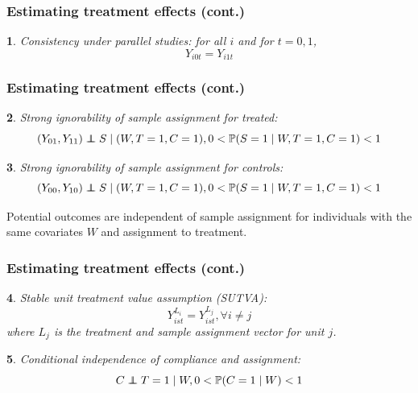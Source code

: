 \documentclass{beamer}
\makeatletter
\newtheorem*{assumption*}{\assumptionnumber}
\providecommand{\assumptionnumber}{}
\newenvironment{assumption}[2]
 {%
  \renewcommand{\assumptionnumber}{Assumption #1}%
  \begin{assumption*}%
  \protected@edef\@currentlabel{#1}%
 }
 {%
  \end{assumption*}
 }
\newcommand{\pr}{\mathbb{P}} %
\newcommand\independent{\protect\mathpalette{\protect\independenT}{\perp}}
\def\independenT#1#2{\mathrel{\rlap{$#1#2$}\mkern2mu{#1#2}}}
\makeatother
\begin{document}
\begin{frame}
\frametitle{Estimating treatment effects (cont.)}
\begin{assumption}{1}{}\label{consistency}
Consistency under parallel studies: for all $i$ and for $t=0, 1$,
$$Y_{i0t} = Y_{i1t}$$
\end{assumption}
\end{frame}

\begin{frame}
\frametitle{Estimating treatment effects (cont.)}
\begin{assumption}{2}{}\label{si_treat}
Strong ignorability of sample assignment for treated:
\begin{equation*}
(Y_{01}, Y_{11}) \independent S \mid (W, T=1,C = 1), 0 < \pr(S=1 \mid W, T=1,C = 1) <1 
\end{equation*}
\end{assumption}

\begin{assumption}{3}{}\label{si_ctrl}
Strong ignorability of sample assignment for controls:
\begin{equation*}
(Y_{00}, Y_{10}) \independent S \mid (W, T=1,C = 1), 0 < \pr(S=1 \mid W, T=1,C = 1) <1 
\end{equation*}\end{assumption}

\noindent Potential outcomes are independent of sample assignment for individuals with the same covariates $W$ and assignment to treatment.
\end{frame}

\begin{frame}
\frametitle{Estimating treatment effects (cont.)}
\begin{assumption}{4}{}\label{sutva}
Stable unit treatment value assumption (SUTVA):
\begin{equation*}
Y_{ist}^{L_i} = Y_{ist}^{L_j},  \forall i \neq j
\end{equation*}
where $L_j$ is the treatment and sample assignment vector for unit $j$. \end{assumption}
 
\begin{assumption}{5}{}\label{compl}
Conditional independence of compliance and assignment:
\begin{equation*}
C \independent T=1 \mid W, 0 < \pr(C = 1 \mid W) < 1
\end{equation*}
\end{assumption}
\end{frame}
\end{document}
